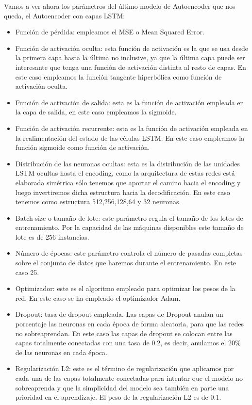 Vamos a ver ahora los parámetros del último modelo de Autoencoder que nos queda, el Autoencoder con capas LSTM:
\begin{itemize}
	\item Función de pérdida: empleamos el MSE o Mean Squared Error.
	\item Función de activación oculta: esta función de activación es la que se usa desde la primera capa hasta la última no inclusive, ya que la última capa puede ser interesante que tenga una función de activación distinta al resto de capas. En este caso empleamos la función tangente hiperbólica como función de activación oculta.
	\item Función de activación de salida: esta es la función de activación empleada en la capa de salida, en este caso empleamos la sigmoide.
	\item Función de activación recurrente: esta es la función de activación empleada en la realimentación del estado de las células LSTM. En este caso empleamos la función sigmoide como función de activación.
	\item Distribución de las neuronas ocultas: esta es la distribución de las unidades LSTM ocultas hasta el encoding, como la arquitectura de estas redes está elaborada simétrica sólo tenemos que aportar el camino hacia el encoding y luego invertiremos dicha estructura hacia la decodificación. En este caso tenemos como estructura 512,256,128,64 y 32 neuronas.
	\item Batch size o tamaño de lote: este parámetro regula el tamaño de los lotes de entrenamiento. Por la capacidad de las máquinas disponibles este tamaño de lote es de 256 instancias.
	\item Número de épocas: este parámetro controla el número de pasadas completas sobre el conjunto de datos que haremos durante el entrenamiento. En este caso 25.
	\item Optimizador: este es el algoritmo empleado para optimizar los pesos de la red. En este caso se ha empleado el optimizador Adam.
	\item Dropout: tasa de dropout empleada. Las capas de Dropout anulan un porcentaje las neuronas en cada época de forma aleatoria, para que las redes no sobreaprendan. En este caso las capas de dropout se colocan entre las capas totalmente conectadas con una tasa de $0.2$, es decir, anulamos el 20\% de las neuronas en cada época.
	\item Regularización L2: este es el término de regularización que aplicamos por cada una de las capas totalmente conectadas para intentar que el modelo no sobreaprenda y que la simplicidad del modelo sea también en parte una prioridad en el aprendizaje. El peso de la regularización L2 es de $0.1$.

\end{itemize}

